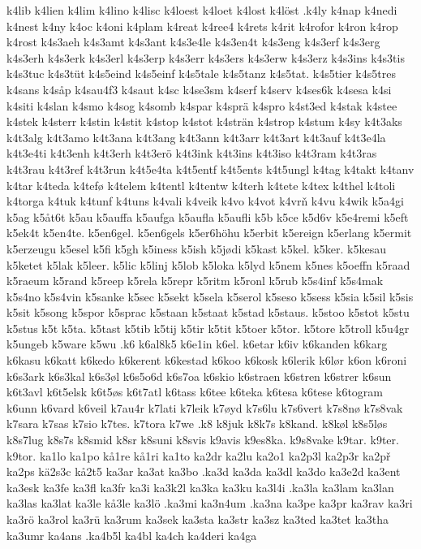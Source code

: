 {{k4lib
k4lien
k4lim
k4lino
k4lisc
k4loest
k4loet
k4lost
k4löst
.k4ly
k4nap
k4nedi
k4nest
k4ny
k4oc
k4oni
k4plam
k4reat
k4ree4
k4rets
k4rit
k4rofor
k4ron
k4rop
k4rost
k4s3aeh
k4s3amt
k4s3ant
k4s3e4le
k4s3en4t
k4s3eng
k4s3erf
k4s3erg
k4s3erh
k4s3erk
k4s3erl
k4s3erp
k4s3err
k4s3ers
k4s3erw
k4s3erz
k4s3ins
k4s3tis
k4s3tuc
k4s3tüt
k4s5eind
k4s5einf
k4s5tale
k4s5tanz
k4s5tat.
k4s5tier
k4s5tres
k4sans
k4såp
k4sau4f3
k4saut
k4sc
k4se3sm
k4serf
k4serv
k4ses6k
k4sesa
k4si
k4siti
k4slan
k4smo
k4sog
k4somb
k4spar
k4sprä
k4spro
k4st3ed
k4stak
k4stee
k4stek
k4sterr
k4stin
k4stit
k4stop
k4stot
k4strän
k4strop
k4stum
k4sy
k4t3aks
k4t3alg
k4t3amo
k4t3ana
k4t3ang
k4t3ann
k4t3arr
k4t3art
k4t3auf
k4t3e4la
k4t3e4ti
k4t3enh
k4t3erh
k4t3erö
k4t3ink
k4t3ins
k4t3iso
k4t3ram
k4t3ras
k4t3rau
k4t3ref
k4t3run
k4t5e4ta
k4t5entf
k4t5ents
k4t5ungl
k4tag
k4takt
k4tanv
k4tar
k4teda
k4tefø
k4telem
k4tentl
k4tentw
k4terh
k4tete
k4tex
k4thel
k4toli
k4torga
k4tuk
k4tunf
k4tuns
k4vali
k4veik
k4vo
k4vot
k4vrň
k4vu
k4wik
k5a4gi
k5ag
k5åt6t
k5au
k5auffa
k5aufga
k5aufla
k5aufli
k5b
k5ce
k5d6v
k5e4remi
k5eft
k5ek4t
k5en4te.
k5en6gel.
k5en6gels
k5er6höhu
k5erbit
k5ereign
k5erlang
k5ermit
k5erzeugu
k5esel
k5fi
k5gh
k5iness
k5ish
k5jødi
k5kast
k5kel.
k5ker.
k5kesau
k5ketet
k5lak
k5leer.
k5lic
k5linj
k5lob
k5loka
k5lyd
k5nem
k5nes
k5oeffn
k5raad
k5raeum
k5rand
k5reep
k5rela
k5repr
k5ritm
k5ronl
k5rub
k5s4inf
k5s4mak
k5s4no
k5s4vin
k5sanke
k5sec
k5sekt
k5sela
k5serol
k5seso
k5sess
k5sia
k5sil
k5sis
k5sit
k5song
k5spor
k5sprac
k5staan
k5staat
k5stad
k5staus.
k5stoo
k5stot
k5stu
k5stus
k5t
k5ta.
k5tast
k5tib
k5tij
k5tir
k5tit
k5toer
k5tor.
k5tore
k5troll
k5u4gr
k5ungeb
k5ware
k5wu
.k6
k6al8k5
k6e1in
k6el.
k6etar
k6iv
k6kanden
k6karg
k6kasu
k6katt
k6kedo
k6kerent
k6kestad
k6koo
k6kosk
k6lerik
k6lør
k6on
k6roni
k6s3ark
k6s3kal
k6s3øl
k6s5o6d
k6s7oa
k6skio
k6straen
k6stren
k6strer
k6sun
k6t3avl
k6t5elsk
k6t5øs
k6t7atl
k6tass
k6tee
k6teka
k6tesa
k6tese
k6togram
k6unn
k6vard
k6veil
k7au4r
k7lati
k7leik
k7øyd
k7s6lu
k7s6vert
k7s8nø
k7s8vak
k7sara
k7sas
k7sio
k7tes.
k7tora
k7we
.k8
k8juk
k8k7s
k8kand.
k8køl
k8s5løs
k8s7lug
k8s7s
k8smid
k8sr
k8suni
k8svis
k9avis
k9es8ka.
k9s8vake
k9tar.
k9ter.
k9tor.
ka1lo
ka1po
kå1re
kå1ri
ka1to
ka2dr
ka2lu
ka2o1
ka2p3l
ka2p3r
ka2př
ka2ps
kä2s3c
kå2t5
ka3ar
ka3at
ka3bo
.ka3d
ka3da
ka3dl
ka3do
ka3e2d
ka3ent
ka3esk
ka3fe
ka3fl
ka3fr
ka3i
ka3k2l
ka3ka
ka3ku
ka3l4i
.ka3la
ka3lam
ka3lan
ka3las
ka3lat
ka3le
kå3le
ka3lö
.ka3mi
ka3n4um
.ka3na
ka3pe
ka3pr
ka3rav
ka3ri
ka3rö
ka3rol
ka3rü
ka3rum
ka3sek
ka3sta
ka3str
ka3sz
ka3ted
ka3tet
ka3tha
ka3umr
ka4ans
.ka4b5l
ka4bl
ka4ch
ka4deri
ka4ga
}}
